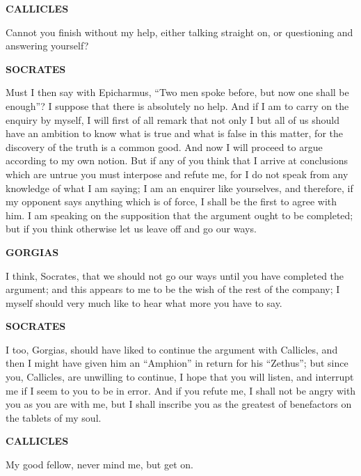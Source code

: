 \documentclass[11pt,letter]{article}
\begin{document}
\par \textbf{CALLICLES}
\par   Cannot you finish without my help, either talking straight on, or questioning and answering yourself?

\par \textbf{SOCRATES}
\par   Must I then say with Epicharmus, “Two men spoke before, but now one shall be enough”? I suppose that there is absolutely no help. And if I am to carry on the enquiry by myself, I will first of all remark that not only I but all of us should have an ambition to know what is true and what is false in this matter, for the discovery of the truth is a common good. And now I will proceed to argue according to my own notion. But if any of you think that I arrive at conclusions which are untrue you must interpose and refute me, for I do not speak from any knowledge of what I am saying; I am an enquirer like yourselves, and therefore, if my opponent says anything which is of force, I shall be the first to agree with him. I am speaking on the supposition that the argument ought to be completed; but if you think otherwise let us leave off and go our ways.

\par \textbf{GORGIAS}
\par   I think, Socrates, that we should not go our ways until you have completed the argument; and this appears to me to be the wish of the rest of the company; I myself should very much like to hear what more you have to say.

\par \textbf{SOCRATES}
\par   I too, Gorgias, should have liked to continue the argument with Callicles, and then I might have given him an “Amphion” in return for his “Zethus”; but since you, Callicles, are unwilling to continue, I hope that you will listen, and interrupt me if I seem to you to be in error. And if you refute me, I shall not be angry with you as you are with me, but I shall inscribe you as the greatest of benefactors on the tablets of my soul.

\par \textbf{CALLICLES}
\par   My good fellow, never mind me, but get on.
\end{document}
